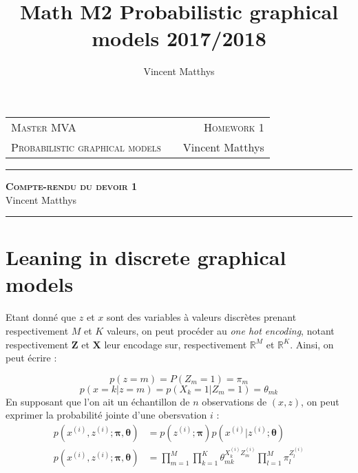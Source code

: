 \documentclass[12pt,a4paper,onecolumn]{article}
\title{Math M2 Probabilistic graphical models 2017/2018}
\author{Vincent Matthys}
\newcommand{\R}{\mathbb{R}} %
\begin{document}
\begin{tabularx}{0.8\textwidth}{@{} l X r @{} }
	{\textsc{Master MVA}}                   &  & \textsc{Homework 1} \\
	\textsc{Probabilistic graphical models} &  & {Vincent Matthys}   \\
\end{tabularx}
\vspace{1.5cm}
\begin{center}
	\rule[11pt]{5cm}{0.5pt}

	\textbf{\LARGE \textsc{Compte-rendu du devoir 1}}
	\vspace{0.5cm}\\
	Vincent Matthys\\
	\rule{5cm}{0.5pt}
	\vspace{1.5cm}
\end{center}

\section{Leaning in discrete graphical models}

Etant donné que \(z\) et \(x\) sont des variables à valeurs discrètes prenant respectivement \(M\) et \(K\) valeurs, on peut procéder au \textit{one hot encoding}, notant respectivement \(\bm{Z}\) et \(\bm{X}\) leur encodage sur, respectivement \(\R^M\) et \(\R^K\). Ainsi, on peut écrire :

\[
	p(z = m) = P(Z_m = 1) = \pi_m
\]
\[
	p(x = k | z = m) = p(X_k = 1 | Z_m = 1) = \theta_{mk}
\]
En supposant que l'on ait un échantillon de \(n\) observations de \((x, z)\), on peut exprimer la probabilité jointe d'une obersvation \(i\) :
\begin{align}
	p(x^{(i)}, z^{(i)} ; \bm{\pi}, \bm{\theta}) & = p(z^{(i)} ; \bm{\pi}) p(x^{(i)} | z^{(i)} ; \bm{\theta})      \nonumber                                        \\
	p(x^{(i)}, z^{(i)} ; \bm{\pi}, \bm{\theta}) & = \prod_{m=1}^M \prod_{k=1}^K \theta_{mk}^{X_k^{(i)} Z_m^{(i)}} \prod_{l = 1}^M\pi_l^{Z_l^{(i)}} \label{1_joint}
\end{align}
\end{document}
